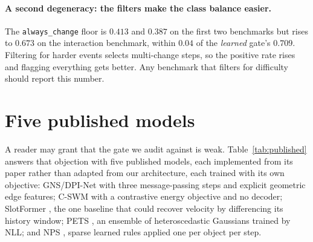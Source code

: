 \documentclass{article}
\begin{document}
\paragraph{A second degeneracy: the filters make the class balance easier.} The
\texttt{always\_change} floor is $0.413$ and $0.387$ on the first two benchmarks but rises to
$0.673$ on the interaction benchmark, within $0.04$ of the \emph{learned} gate's $0.709$.
Filtering for harder events selects multi-change steps, so the positive rate rises and flagging
everything gets better. Any benchmark that filters for difficulty should report this number.

\section{Five published models}
\label{sec:published}

\begin{table}[t]
\caption{Five published object-centric world models against one line of code, implemented from
their papers, trained with their native objectives, capacity-matched to $\sim$8.5--8.8k
parameters, on identical splits. Every model flags essentially every object
(recall $0.993$--$1.000$); the trivial velocity rule beats all five on the motion benchmark
at every object count. C-SWM has no decoder, so its change-detection numbers come from a probe
trained on frozen latents; its native ranking metrics are reported in the text instead.
\textbf{The five rows agreeing to three decimals is the result, not a transcription error}: once
recall is pinned at $1$, precision is the split's positive rate $p$ and F1 is therefore exactly
$2p/(1+p)$ for every model, regardless of architecture. The models differ from each other only
in pose accuracy (unchanged-object L2 $0.064$--$0.089$), never in which objects they flag.
Mean over object counts $\{3,5,8\}$; five seeds on the motion benchmark, and on the onset
benchmark five seeds at $N=3,5$ and three at $N=8$.}
\label{tab:published}
\centering
\small

\end{table}

A reader may grant that the gate we audit against is weak. Table~\ref{tab:published} answers that objection
with five published models, each implemented from its paper rather than adapted from our
architecture, each trained with its own objective: GNS/DPI-Net
\citep{sanchezgonzalez2020gns,li2019dpinet} with three message-passing steps and explicit
geometric edge features; C-SWM \citep{kipf2020cswm} with a contrastive energy objective and no
decoder; SlotFormer \citep{wu2023slotformer}, the one baseline that could recover velocity by
differencing its history window; PETS \citep{chua2018pets}, an ensemble of heteroscedastic
Gaussians trained by NLL; and NPS \citep{goyal2021nps}, sparse learned rules applied one per
object per step.
\end{document}
